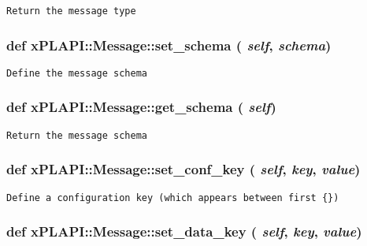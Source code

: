 \footnotesize\begin{verbatim}
Return the message type
\end{verbatim}
\normalsize
 \hypertarget{classxPLAPI_1_1Message_560b2b7685ee99a34ea7d01e7135477c}{
\subsubsection[set\_\-schema]{\setlength{\rightskip}{0pt plus 5cm}def xPLAPI::Message::set\_\-schema ( {\em self}, \/   {\em schema})}}
\label{classxPLAPI_1_1Message_560b2b7685ee99a34ea7d01e7135477c}




\footnotesize\begin{verbatim}
Define the message schema
\end{verbatim}
\normalsize
 \hypertarget{classxPLAPI_1_1Message_58df48b064cb3d59780a51c67136e88a}{
\subsubsection[get\_\-schema]{\setlength{\rightskip}{0pt plus 5cm}def xPLAPI::Message::get\_\-schema ( {\em self})}}
\label{classxPLAPI_1_1Message_58df48b064cb3d59780a51c67136e88a}




\footnotesize\begin{verbatim}
Return the message schema
\end{verbatim}
\normalsize
 \hypertarget{classxPLAPI_1_1Message_014808e1035dcea973692d4d823427ce}{
\subsubsection[set\_\-conf\_\-key]{\setlength{\rightskip}{0pt plus 5cm}def xPLAPI::Message::set\_\-conf\_\-key ( {\em self}, \/   {\em key}, \/   {\em value})}}
\label{classxPLAPI_1_1Message_014808e1035dcea973692d4d823427ce}




\footnotesize\begin{verbatim}
Define a configuration key (which appears between first {})
\end{verbatim}
\normalsize
 \hypertarget{classxPLAPI_1_1Message_6bc039067bf79dd06b649e95870cfba9}{
\subsubsection[set\_\-data\_\-key]{\setlength{\rightskip}{0pt plus 5cm}def xPLAPI::Message::set\_\-data\_\-key ( {\em self}, \/   {\em key}, \/   {\em value})}}
\label{classxPLAPI_1_1Message_6bc039067bf79dd06b649e95870cfba9}




